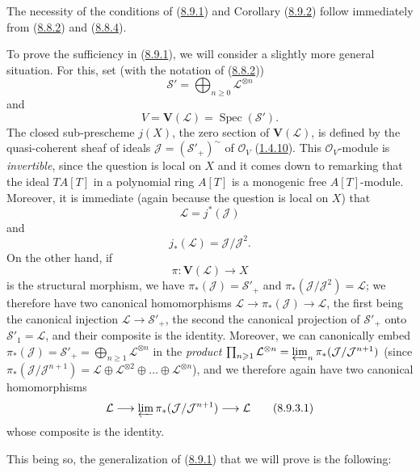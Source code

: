 \begin{env}[8.9.3]
\label{II.8.9.3}
The necessity of the conditions of (\hyperref[II.8.9.1]{8.9.1}) and
Corollary (\hyperref[II.8.9.2]{8.9.2}) follow immediately from
(\hyperref[II.8.8.2]{8.8.2}) and
(\hyperref[II.8.8.4]{8.8.4}).

To prove the sufficiency in (\hyperref[II.8.9.1]{8.9.1}), we
will consider a slightly more general situation. For this, set (with the
notation of (\hyperref[II.8.8.2]{8.8.2}))
\[
  \mathcal{S}'=\bigoplus_{n\geqslant 0}\mathcal{L}^{\otimes n}
\]
and
\[
  V=\mathbf{V}(\mathcal{L})=\operatorname{Spec}(\mathcal{S}').
\]
The closed sub-prescheme $j(X)$, the zero section of $\mathbf{V}(\mathcal{L})$,
is defined by the quasi-coherent sheaf of ideals
$\mathcal{J}=(\mathcal{S}'_+)^{\sim}$ of $\mathcal{O}_V$
(\hyperref[II.1.4.10]{1.4.10}). This $\mathcal{O}_V$-module is
\emph{invertible}, since the question is local on $X$ and it comes down to
remarking that the ideal $TA[T]$ in a polynomial ring $A[T]$ is a monogenic
free $A[T]$-module. Moreover, it is immediate (again because the
question is local on $X$) that
\[
  \mathcal{L}=j^*(\mathcal{J})
\]
and
\[
  j_*(\mathcal{L})=\mathcal{J}/\mathcal{J}^2.
\]
On the other hand, if
\[
  \pi:\mathbf{V}(\mathcal{L})\longrightarrow X
\]
is the structural morphism, we have
$\pi_*(\mathcal{J})=\mathcal{S}'_+$ and
$\pi_*(\mathcal{J}/\mathcal{J}^2)=\mathcal{L}$; we therefore have two
canonical homomorphisms
$\mathcal{L}\to\pi_*(\mathcal{J})\to\mathcal{L}$, the first being
the canonical injection $\mathcal{L}\to\mathcal{S}'_+$, the second the
canonical projection of $\mathcal{S}'_+$ onto $\mathcal{S}'_1=\mathcal{L}$,
and their composite is the identity. Moreover, we can canonically embed $\pi_*(\mathcal{J})=\mathcal{S}'_+=\bigoplus_{n\geqslant 1}\mathcal{L}^{\otimes n}$
in the \emph{product} $\prod_{n\geqslant 1}\mathcal{L}^{\otimes n}=\varprojlim_n\pi_*(\mathcal{J}/\mathcal{J}^{n+1})$
(since
$\pi_*(\mathcal{J}/\mathcal{J}^{n+1})=
\mathcal{L}\oplus\mathcal{L}^{\otimes2}\oplus\ldots\oplus
\mathcal{L}^{\otimes n}$), and we therefore again have two canonical
homomorphisms
\begin{equation}
\label{II.8.9.3.1}
  \mathcal{L}\longrightarrow
  \varprojlim\pi_*(\mathcal{J}/\mathcal{J}^{n+1})
  \longrightarrow\mathcal{L}
\tag{8.9.3.1}
\end{equation}
whose composite is the identity.

This being so, the generalization of (\hyperref[II.8.9.1]{8.9.1}) that we
will prove is the following:
\end{env}

